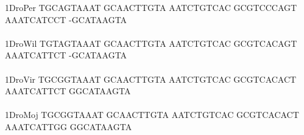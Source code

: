 \documentclass[11pt,twoside,reqno,a4paper]{article}
\begin{document}
{1\hspace*{3\charwidth}DroPer	TGCAGTAAAT	GCAACTTGTA	AATCTGTCAC	GCGTCCCAGT	AAATCATCCT	-GCATAAGTA	\\
\hspace*{4\charwidth}\hspace*{7\charwidth}\hspace*{1\charwidth}\hspace*{1\charwidth}\hspace*{1\charwidth}\hspace*{1\charwidth}\hspace*{1\charwidth}\hspace*{1\charwidth}\\
1\hspace*{3\charwidth}DroWil	TGTAGTAAAT	GCAACTTGTA	AATCTGTCAC	GCGTCACAGT	AAATCATTCT	-GCATAAGTA	\\
\hspace*{4\charwidth}\hspace*{7\charwidth}\hspace*{1\charwidth}\hspace*{1\charwidth}\hspace*{1\charwidth}\hspace*{1\charwidth}\hspace*{1\charwidth}\hspace*{1\charwidth}\\
1\hspace*{3\charwidth}DroVir	TGCGGTAAAT	GCAACTTGTA	AATCTGTCAC	GCGTCACACT	AAATCATTCT	GGCATAAGTA	\\
\hspace*{4\charwidth}\hspace*{7\charwidth}\hspace*{1\charwidth}\hspace*{1\charwidth}\hspace*{1\charwidth}\hspace*{1\charwidth}\hspace*{1\charwidth}\hspace*{1\charwidth}\\
1\hspace*{3\charwidth}DroMoj	TGCGGTAAAT	GCAACTTGTA	AATCTGTCAC	GCGTCACACT	AAATCATTGG	GGCATAAGTA	\\
\hspace*{4\charwidth}\hspace*{7\charwidth}\hspace*{1\charwidth}\hspace*{1\charwidth}\hspace*{1\charwidth}\hspace*{1\charwidth}\hspace*{1\charwidth}\hspace*{1\charwidth}\\
}
\end{document}
